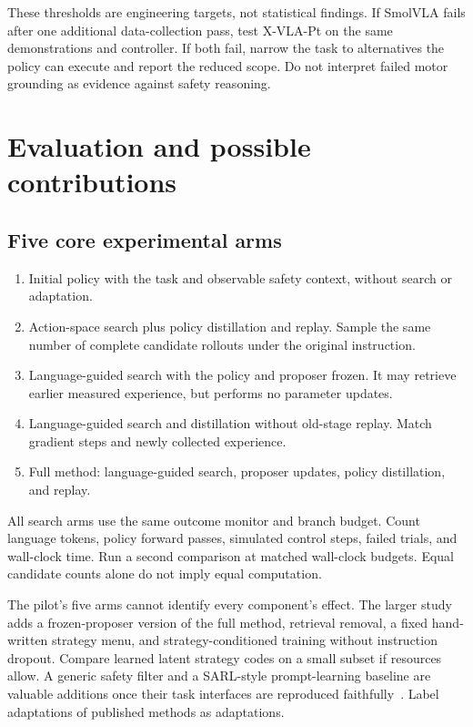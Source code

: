 \documentclass[11pt]{article}
\begin{document}
These thresholds are engineering targets, not statistical findings. If SmolVLA fails after one additional data-collection pass, test X-VLA-Pt on the same demonstrations and controller. If both fail, narrow the task to alternatives the policy can execute and report the reduced scope. Do not interpret failed motor grounding as evidence against safety reasoning.

\section{Evaluation and possible contributions}

\subsection{Five core experimental arms}

\begin{enumerate}
\item Initial policy with the task and observable safety context, without search or adaptation.
\item Action-space search plus policy distillation and replay. Sample the same number of complete candidate rollouts under the original instruction.
\item Language-guided search with the policy and proposer frozen. It may retrieve earlier measured experience, but performs no parameter updates.
\item Language-guided search and distillation without old-stage replay. Match gradient steps and newly collected experience.
\item Full method: language-guided search, proposer updates, policy distillation, and replay.
\end{enumerate}

All search arms use the same outcome monitor and branch budget. Count language tokens, policy forward passes, simulated control steps, failed trials, and wall-clock time. Run a second comparison at matched wall-clock budgets. Equal candidate counts alone do not imply equal computation.

The pilot's five arms cannot identify every component's effect. The larger study adds a frozen-proposer version of the full method, retrieval removal, a fixed hand-written strategy menu, and strategy-conditioned training without instruction dropout. Compare learned latent strategy codes on a small subset if resources allow. A generic safety filter and a SARL-style prompt-learning baseline are valuable additions once their task interfaces are reproduced faithfully~\cite{sarl}. Label adaptations of published methods as adaptations.
\end{document}
